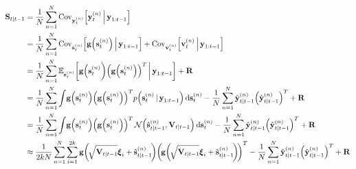 		\begin{align}
			\mat{S}_{t \subgiven t - 1}
				&= \frac{1}{N} \sum_{n = 1}^{N} \Cov_{\vec{y}_t^{(n)}}\!\Big[\vec{y}_t^{(n)} \Biggiven \vec{y}_{1:t - 1}\Big]  \nonumber \\
				&= \frac{1}{N} \sum_{n = 1}^{N} \Cov_{\vec{s}_t^{(n)}}\!\Big[\vec{g}\Big(\vec{s}_t^{(n)}\Big) \Biggiven \vec{y}_{1:t - 1}\Big] + \Cov_{\vec{v}_t^{(n)}}\!\Big[\vec{v}_t^{(n)} \Biggiven \vec{y}_{1:t - 1}\Big]  \nonumber \\
				&= \frac{1}{N} \sum_{n = 1}^{N} \E_{\vec{s}_t^{(n)}}\bigg[\vec{g}\Big(\vec{s}_t^{(n)}\bigg) \Big(\vec{g}\Big(\vec{s}_t^{(n)}\Big)\Big)^T \bigggiven \vec{y}_{1:t - 1}\bigg] + \mat{R}  \nonumber \\
				&= \frac{1}{N} \sum_{n = 1}^{N} \int\! \vec{g}\Big(\vec{s}_t^{(n)}\Big) \Big(\vec{g}\Big(\vec{s}_t^{(n)}\Big)\Big)^T p\Big(\vec{s}_t^{(n)} \given \vec{y}_{1:t - 1}\Big) \dd{\vec{s}_t^{(n)}} - \frac{1}{N} \sum_{n = 1}^{N} \hat{\vec{y}}_{t \subgiven t - 1}^{(n)} \Big( \hat{\vec{y}}_{t \subgiven t - 1}^{(n)} \Big)^T + \mat{R}  \nonumber \\
				&= \frac{1}{N} \sum_{n = 1}^{N} \int\! \vec{g}\Big(\vec{s}_t^{(n)}\Big) \Big(\vec{g}\Big(\vec{s}_t^{(n)}\Big)\Big)^T \,\normal\Big(\hat{\vec{s}}_{t \subgiven t - 1}^{(n)}, \mat{V}_{t \subgiven t - 1}\Big) \dd{\vec{s}_t^{(n)}} - \frac{1}{N} \sum_{n = 1}^{N} \hat{\vec{y}}_{t \subgiven t - 1}^{(n)} \Big( \hat{\vec{y}}_{t \subgiven t - 1}^{(n)} \Big)^T + \mat{R}  \nonumber \\
				&\approx \frac{1}{2kN} \sum_{n = 1}^{N} \sum_{i = 1}^{2k} \vec{g}\bigg(\!\sqrt{\mat{V}_{t \subgiven t - 1}} \vec{\xi}_i + \hat{\vec{s}}_{t \subgiven t - 1}^{(n)}\!\bigg) \bigg(\!\vec{g}\bigg(\!\sqrt{\mat{V}_{t \subgiven t - 1}} \vec{\xi}_i + \hat{\vec{s}}_{t \subgiven t - 1}^{(n)}\!\bigg)\!\bigg)^T - \frac{1}{N} \sum_{n = 1}^{N} \hat{\vec{y}}_{t \subgiven t - 1}^{(n)} \Big( \hat{\vec{y}}_{t \subgiven t - 1}^{(n)} \Big)^T + \mat{R}  \label{eq:cubatureS}
		\end{align}
